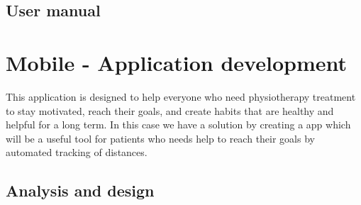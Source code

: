 





\subsection{User manual}


\section{Mobile - Application development}

\par This application is designed to help everyone who need physiotherapy treatment to stay motivated,
 reach their goals, and create habits that are healthy and helpful for a long term. 
 In this case we have a solution by creating a app which will be a useful tool for patients who needs help 
 to reach their goals by automated tracking of distances.
\subsection{Analysis and design}
